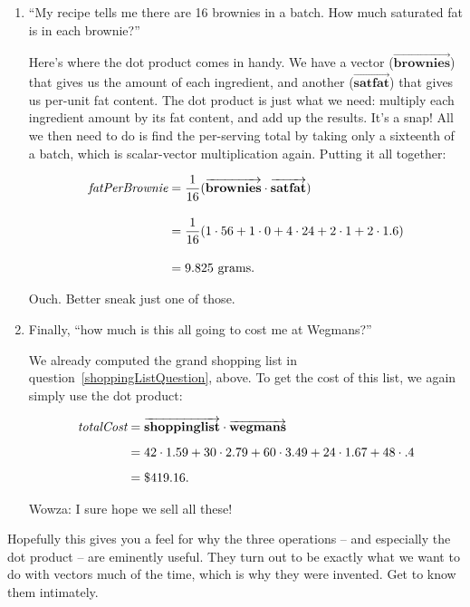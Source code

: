 \begin{enumerate}
\item ``My recipe tells me there are 16 brownies in a batch. How much saturated
fat is in each brownie?''


Here's where the dot product comes in handy. We have a vector
($\overrightarrow{\textbf{brownies}}$) that gives us the amount of each
ingredient, and another ($\overrightarrow{\textbf{satfat}}$) that gives us
per-unit fat content. The dot product is just what we need: multiply each
ingredient amount by its fat content, and add up the results. It's a snap! All
we then need to do is find the per-serving total by taking only a sixteenth of
a batch, which is scalar-vector multiplication again. Putting it all together:

\begin{align*}
\textit{fatPerBrownie} &=
\frac{1}{16} (\overrightarrow{\textbf{brownies}} \cdot
\overrightarrow{\textbf{satfat}}) \\[10pt]
&= \frac{1}{16} (1\cdot 56 + 1\cdot 0 + 4\cdot 24 + 2\cdot 1 + 2\cdot 1.6)
\smallskip \\[10pt]
&= 9.825\  \textrm{grams}.
\end{align*}

Ouch. Better sneak just one of those.

\item Finally, ``how much is this all going to cost me at Wegmans?''

We already computed the grand shopping list in
question~\ref{shoppingListQuestion}, above. To get the cost of this list, we
again simply use the dot product:

\begin{align*}
\textit{totalCost} &=
\overrightarrow{\textbf{shoppinglist}} \cdot
\overrightarrow{\textbf{wegmans}} \\[5pt]
&= 42\cdot 1.59 + 30\cdot 2.79 + 60\cdot 3.49 + 24\cdot 1.67 + 48\cdot .4
\smallskip \\[5pt]
&= \$419.16.
\end{align*}

Wowza: I sure hope we sell all these!

\end{enumerate}

Hopefully this gives you a feel for why the three operations -- and especially
the dot product -- are eminently useful. They turn out to be exactly what we
want to do with vectors much of the time, which is why they were invented. Get
to know them intimately.

